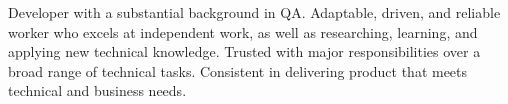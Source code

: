 

\begin{cvparagraph}

Developer with a substantial background in QA. Adaptable, driven, and reliable worker who excels at independent work, as well as researching, learning, and applying new technical knowledge. Trusted with major responsibilities over a broad range of technical tasks. Consistent in delivering product that meets technical and business needs.
\end{cvparagraph}
